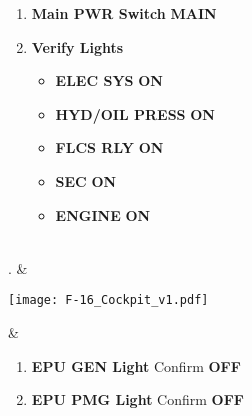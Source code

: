 \documentclass[fontInter]{TechCheck}
\begin{document}
\begin{listlongtable}
\begin{minipage}[t]{\linewidth}
\begin{enumerate}
				\item \textbf{Main PWR Switch} \dotfill \textbf{MAIN}
				\item \textbf{Verify Lights}
				\begin{itemize}
					\item \textbf{ELEC SYS} \dotfill \textbf{ON}
					\item \textbf{HYD/OIL PRESS} \dotfill \textbf{ON}
					\item \textbf{FLCS RLY} \dotfill \textbf{ON}
					\item \textbf{SEC} \dotfill \textbf{ON}
					\item \textbf{ENGINE} \dotfill \textbf{ON}
				\end{itemize}
			\end{enumerate}
		\end{minipage} \\
		. & 
		\begin{minipage}[t]{\linewidth}
			\vspace{-7pt}
			\centering
			\texttt{[image: F-16\_Cockpit\_v1.pdf]}
		\end{minipage} &
		\begin{minipage}[t]{\linewidth}
			\vspace{-7pt}
			\begin{enumerate}
				\item \textbf{EPU GEN Light} \dotfill Confirm \textbf{OFF}
				\item \textbf{EPU PMG Light} \dotfill Confirm \textbf{OFF}
			\end{enumerate}
		\end{minipage} \\
	\end{listlongtable}
	\clearpage
\end{document}
